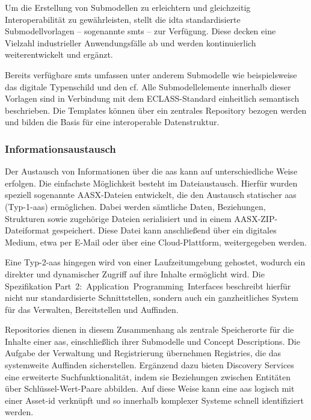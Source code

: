 Um die Erstellung von Submodellen zu erleichtern und gleichzeitig Interoperabilität zu gewährleisten, stellt die \acs{idta} standardisierte Submodellvorlagen -- sogenannte \acp{smt} -- zur Verfügung.
Diese decken eine Vielzahl industrieller Anwendungsfälle ab und werden kontinuierlich weiterentwickelt und ergänzt.

Bereits verfügbare \acsp{smt} umfassen unter anderem Submodelle wie beispielsweise das digitale Typenschild und den \ac{cf}.
Alle Submodellelemente innerhalb dieser Vorlagen sind in Verbindung mit dem ECLASS-Standard einheitlich semantisch beschrieben.
Die Templates können über ein zentrales Repository \cite{idtaTemplates} bezogen werden und bilden die Basis für eine interoperable Datenstruktur.

\subsubsection{Informationsaustausch}

Der Austausch von Informationen über die \acs{aas} kann auf unterschiedliche Weise erfolgen.
Die einfachste Möglichkeit besteht im Dateiaustausch. 
Hierfür wurden speziell sogenannte AASX-Dateien \cite{SpezifikationPart5} entwickelt, die den Austausch statischer \acs{aas} (Typ-1-\acs{aas}) ermöglichen.
Dabei werden sämtliche Daten, Beziehungen, Strukturen sowie zugehörige Dateien serialisiert und in einem AASX-ZIP-Dateiformat gespeichert. 
Diese Datei kann anschließend über ein digitales Medium, etwa per E-Mail oder über eine Cloud-Plattform, weitergegeben werden. 

Eine Typ-2-\acs{aas} hingegen wird von einer Laufzeitumgebung gehostet, wodurch ein direkter und dynamischer Zugriff auf ihre Inhalte ermöglicht wird. 
Die Spezifikation \mbox{Part 2: Application Programming Interfaces} \cite{SpezifikationPart2} beschreibt hierfür nicht nur standardisierte Schnittstellen, sondern auch ein ganzheitliches System für das Verwalten, Bereitstellen und Auffinden.

Repositories dienen in diesem Zusammenhang als zentrale Speicherorte für die Inhalte einer \acs{aas}, einschließlich ihrer Submodelle und Concept Descriptions. 
Die Aufgabe der Verwaltung und Registrierung übernehmen Registries, die das systemweite Auffinden sicherstellen.
Ergänzend dazu bieten Discovery Services eine erweiterte Suchfunktionalität, indem sie Beziehungen zwischen Entitäten über Schlüssel-Wert-Paare abbilden.
Auf diese Weise kann eine \acs{aas} logisch mit einer Asset-\acs{id} verknüpft und so innerhalb komplexer Systeme schnell identifiziert werden.

